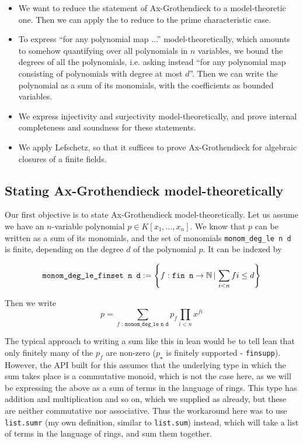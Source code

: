 \begin{itemize}
  \item We want to reduce the statement of Ax-Grothendieck to a model-theoretic one.
        Then we can apply the  to
        reduce to the prime characteristic case.
  \item To express ``for any polynomial map ...'' model-theoretically,
        which amounts to somehow quantifying over all polynomials
        in $n$ variables,
        we bound the degrees of all the polynomials,
        i.e. asking instead ``for any polynomial map consisting of
        polynomials with degree at most $d$''.
        Then we can write the polynomial as a sum of its monomials,
        with the coefficients as bounded variables.
  \item We express injectivity and surjectivity model-theoretically,
        and prove internal completeness and soundness for these statements.
  \item We apply Lefschetz, so that it suffices to prove Ax-Grothendieck for
        algebraic closures of a finite fields.
\end{itemize}

\subsection{Stating Ax-Grothendieck model-theoretically}

Our first objective is to state Ax-Grothendieck model-theoretically.
Let us assume we have an $n$-variable polynomial $p \in K[x_{1},\dots,x_{n}]$.
We know that $p$ can be written as a sum of its monomials,
and the set of monomials \texttt{monom\_deg\_le n d} is finite,
depending on the degree $d$ of the polynomial $p$.
It can be indexed by

\[ \texttt{monom\_deg\_le\_finset n d} := \left\{ f : \texttt{fin n} \to \mathbb{N} \,|\, \sum_{i < n} f i \le d \right\}\]

Then we write
\[ p = \sum_{f\texttt{ : monom\_deg\_le n d}} p_{f}\prod_{i < n} x^{f i}\]

The typical approach to writing a sum like this in lean would be
to tell lean that only finitely many of the $p_{f}$ are non-zero
($p_{\star}$ is finitely supported - \texttt{finsupp}).
However, the API built for this assumes that the underlying
type in which the sum takes place is a commutative monoid,
which is not the case here,
as we will be expressing the above as a sum of terms
in the language of rings.
This type has addition and multiplication and so on,
which we supplied as  already,
but these are neither commutative nor associative.
Thus the workaround here was to use \texttt{list.sumr}
(my own definition, similar to \texttt{list.sum}) instead,
which will take a list of terms in the language of rings, and sum them together.

